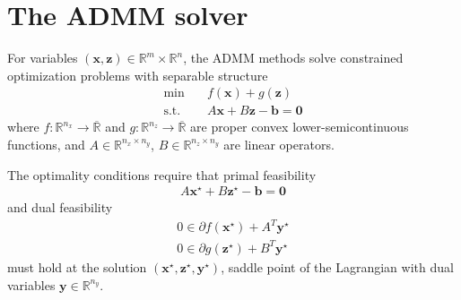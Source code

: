 \documentclass[AMA,STIX1COL]{WileyNJD-v2}
\newcommand{\vect}[1]{\bm{#1}}
\begin{document}
\section{The ADMM solver}




For variables $(\vect{x},\vect{z}) \in \mathbb{R}^m \times \mathbb{R}^n$, the ADMM methods solve constrained optimization problems with separable structure
\begin{subequations}
	\begin{align}
    \text{min} \quad  & f(\vect{x}) + g(\vect{z}) \\
	  \text{s.t.} \quad &  A \vect{x} + B \vect{z} - \vect{b} = \vect{0}
	\end{align}
	\label{eq:admm}
\end{subequations}
where $f : \mathbb{R}^{n_x}\rightarrow\overline{\mathbb{R}}$ and  $g : \mathbb{R}^{n_z}\rightarrow\overline{\mathbb{R}}$ are proper convex lower-semicontinuous functions,
and $A \in \mathbb{R}^{n_x \times n_y}$, $B \in \mathbb{R}^{n_z \times n_y}$ are linear operators.

The optimality conditions require that primal feasibility
\begin{align}
A \vect{x}^\star + B \vect{z}^\star - \vect{b} = \vect{0} \label{eq:primalfeasibility1}
\end{align}
and dual feasibility
\begin{subequations}
	\begin{align}
     0 \in \partial	f(\vect{x}^\star) + A^T \vect{y}^\star \label{eq:dualfeasibility1}\\
	   0 \in \partial	g(\vect{z}^\star) + B^T \vect{y}^\star \label{eq:dualfeasibility2}
	\end{align}
	\label{eq:admm}
\end{subequations}
must hold at the solution $(\vect{x}^\star,\vect{z}^\star,\vect{y}^\star)$, saddle point of the Lagrangian with dual variables $\vect{y} \in \mathbb{R}^{n_y}$.
\end{document}
